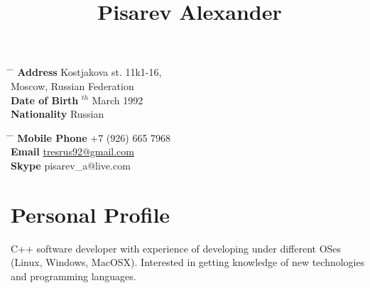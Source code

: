 \documentclass[10pt]{article} %
\begin{document}

\title{Pisarev Alexander} %


\parbox{0.5\textwidth}{ %
\begin{tabbing} %
\hspace{3cm} \= \hspace{4cm} \= \kill %
{\bf Address} \> Kostjakova st. 11k1-16,\\ %
\> Moscow, Russian Federation \\ %
{\bf Date of Birth} $^{th}$ March 1992 \\ %
{\bf Nationality} \> Russian %
\end{tabbing}}
\hfill %
\parbox{0.5\textwidth}{ %
\begin{tabbing} %
\hspace{3cm} \= \hspace{4cm} \= \kill %
{\bf Mobile Phone} \> +7 (926) 665 7968 \\ %
{\bf Email} \> \href{mailto:tresrus92@gmail.com}{tresrus92@gmail.com} \\ %
{\bf Skype} \> pisarev\_a@live.com \\ %
\end{tabbing}}


\section{Personal Profile}

C++ software developer with experience of developing under different OSes (Linux, Windows, MacOSX). Interested in getting knowledge of new technologies and programming languages.

\end{document}
